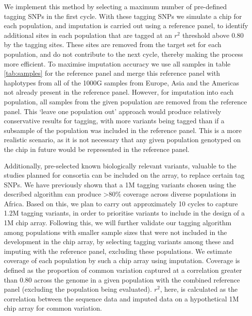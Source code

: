 {

We implement this method by selecting a maximum number of pre-defined tagging SNPs in the first cycle. With these tagging SNPs we simulate a chip for each population, and imputation is carried out using a reference panel, to identify additional sites in each population that are tagged at an $r^{2}$ threshold above 0.80 by the tagging sites. These sites are removed from the target set for each population, and do not contribute to the next cycle, thereby making the process more efficient. To maximise imputation accuracy we use all samples in table \ref{tab:samples} for the reference panel and merge this reference panel with haplotypes from all of the 1000G samples from Europe, Asia and the Americas not already present in the reference panel. However, for imputation into each population, all samples from the given population are removed from the reference panel. This ‘leave one population out’ approach would produce relatively conservative results for tagging, with more variants being tagged than if a subsample of the population was included in the reference panel. This is a more realistic scenario, as it is not necessary that any given population genotyped on the chip in future would be represented in the reference panel.

Additionally, pre-selected known biologically relevant variants, valuable to the studies planned for consortia can be included on the array, to replace certain tag SNPs. We have previously shown that a 1M tagging variants chosen using the described algorithm can produce \textgreater80\% coverage across diverse populations in Africa. Based on this, we plan to carry out approximately 10 cycles to capture 1.2M tagging variants, in order to prioritise variants to include in the design of a 1M chip array. Following this, we will further validate our tagging algorithm among populations with smaller sample sizes that were not included in the development in the chip array, by selecting tagging variants among these and imputing with the reference panel, excluding these populations. We estimate coverage of each population by such a chip array using imputation. Coverage is defined as the proportion of common variation captured at a correlation greater than 0.80 across the genome in a given population with the combined reference panel (excluding the population being evaluated). $r^{2}$, here, is calculated as the correlation between the sequence data and imputed data on a hypothetical 1M chip array for common variation. 

}
